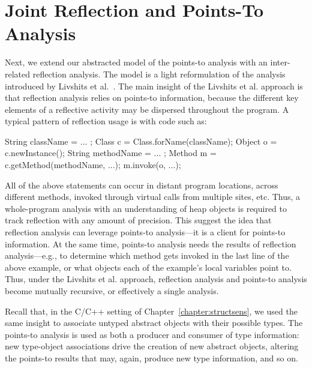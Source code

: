 \section{Joint Reflection and Points-To Analysis}
\label{reflection/sec:model}

Next, we extend our abstracted model of the points-to analysis with
an inter-related reflection analysis.
%
The model is a light reformulation of the analysis introduced by Livshits et
al.~\cite{aplas/LivshitsWL05,livshits:thesis}.  The main insight of
the Livshits et al. approach is that reflection analysis relies on
points-to information, because the different key elements of a
reflective activity may be dispersed throughout the program. A typical
pattern of reflection usage is with code such as:

\begin{javacodelinum}
String className = ... ;
Class c = Class.forName(className);
Object o = c.newInstance();
String methodName = ... ;
Method m = c.getMethod(methodName, ...);
m.invoke(o, ...);
\end{javacodelinum}

All of the above statements can occur in distant program locations,
across different methods, invoked through virtual calls from multiple
sites, etc. Thus, a whole-program analysis with an understanding of
heap objects is required to track reflection with any amount of
precision. This suggest the idea that reflection analysis can leverage
points-to analysis---it is a client for points-to information. At the
same time, points-to analysis needs the results of reflection
analysis---e.g., to determine which method gets invoked in the last
line of the above example, or what objects each of the example's local
variables point to. Thus, under the Livshits et al. approach,
reflection analysis and points-to analysis become mutually recursive,
or effectively a single analysis.

Recall that, in the C/C++ setting of Chapter~\ref{chapter:structsens},
we used the same insight to associate untyped abstract objects with
their possible types. The points-to analysis is used as both a
producer and consumer of type information: new type-object
associations drive the creation of new abstract objects, altering the
points-to results that may, again, produce new type information, and so
on.

